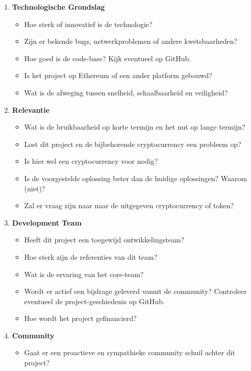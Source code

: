 \begin{enumerate}

    \item \textbf{Technologische Grondslag}
    \begin{itemize}
        \item Hoe sterk of innovatief is de technologie?
        \item Zijn er bekende bugs, netwerkproblemen of andere kwetsbaarheden?
        \item Hoe goed is de code-base? Kijk eventueel op GitHub.
        \item Is het project op Ethereum of een ander platform gebouwd?
        \item Wat is de afweging tussen snelheid, schaalbaarheid en veiligheid?
    \end{itemize}
    \item \textbf{Relevantie}
    \begin{itemize}
        \item Wat is de bruikbaarheid op korte termijn en het nut op lange termijn?
        \item Lost dit project en de bijbehorende cryptocurrency een probleem op? 
        \item Is hier wel een cryptocurrency voor nodig?
        \item Is de voorgestelde oplossing beter dan de huidige oplossingen? Waarom (niet)?
        \item Zal er vraag zijn naar naar de uitgegeven cryptocurrency of token? 
    \end{itemize}
    \item \textbf{Development Team}
    \begin{itemize}
        \item Heeft dit project een toegewijd ontwikkelingsteam?
        \item Hoe sterk zijn de referenties van dit team? 
        \item Wat is de ervaring van het core-team?  
        \item Wordt er actief een bijdrage geleverd vanuit de community? Controleer eventueel de project-geschiedenis op GitHub.
        \item Hoe wordt het project gefinancierd?
      
    \end{itemize}
    \item \textbf{Community}
    \begin{itemize}
        \item Gaat er een proactieve en sympathieke community schuil achter dit project?
     

\end{itemize}
\end{enumerate}
